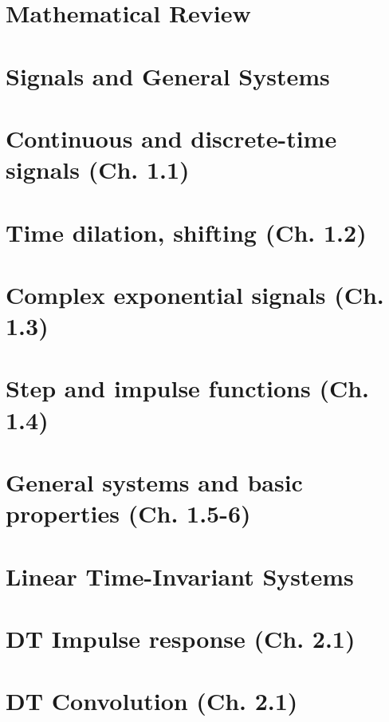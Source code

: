 \documentclass{article}
\begin{document}
\section{Mathematical Review}

\newpage

\section*{Signals and General Systems}
\section{Continuous and discrete-time signals (Ch. 1.1)}

\newpage

\section{Time dilation, shifting (Ch. 1.2)}

\newpage

\section{Complex exponential signals (Ch. 1.3)}

\newpage

\section{Step and impulse functions (Ch. 1.4)}

\newpage

\section{General systems and basic properties (Ch. 1.5-6)}

\newpage

\section*{Linear Time-Invariant Systems}
\section{DT Impulse response (Ch. 2.1)}

\newpage

\section{DT Convolution (Ch. 2.1)}

\newpage
\end{document}
